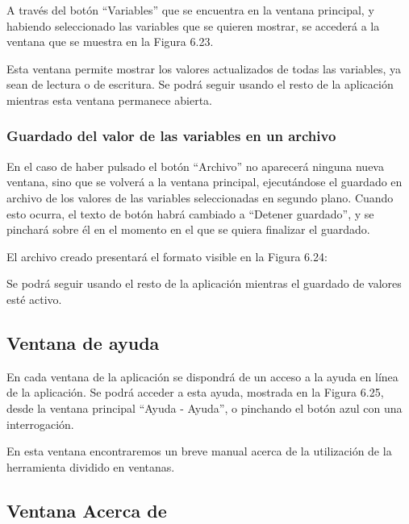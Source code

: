 A través del botón ``Variables'' que se encuentra en la ventana principal, y habiendo seleccionado las variables que se quieren mostrar, se accederá a la ventana que se muestra en la Figura 6.23.


Esta ventana permite mostrar los valores actualizados de todas las variables, ya sean de lectura o de escritura. Se podrá seguir usando el resto de la aplicación mientras esta ventana permanece abierta.

\subsubsection{Guardado del valor de las variables en un archivo}

En el caso de haber pulsado el botón ``Archivo'' no aparecerá ninguna nueva ventana, sino que se volverá a la ventana principal, ejecutándose el guardado en archivo de los valores de las variables seleccionadas en segundo plano. Cuando esto ocurra, el texto de botón habrá cambiado a ``Detener guardado'', y se pinchará sobre él en el momento en el que se quiera finalizar el guardado.

El archivo creado presentará el formato visible en la Figura 6.24:


Se podrá seguir usando el resto de la aplicación mientras el guardado de valores esté activo.

\subsection{Ventana de ayuda}

En cada ventana de la aplicación se dispondrá de un acceso a la ayuda en línea de la aplicación. Se podrá acceder a esta ayuda, mostrada en la Figura 6.25, desde la ventana principal ``Ayuda - Ayuda'', o pinchando el botón azul con una interrogación.


En esta ventana encontraremos un breve manual acerca de la utilización de la herramienta dividido en ventanas.

\subsection{Ventana Acerca de}

